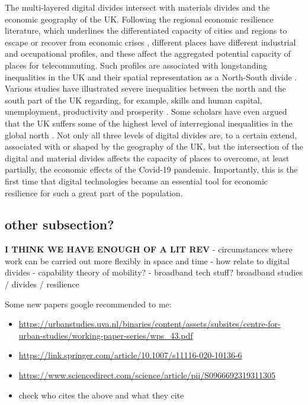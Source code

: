\documentclass[]{interact}
\theoremstyle{plain}%
\theoremstyle{definition}
\theoremstyle{remark}
\def\tightlist{}
\begin{document}
The multi-layered digital divides intersect with materials divides and
the economic geography of the UK. Following the regional economic
resilience literature, which underlines the differentiated capacity of
cities and regions to escape or recover from economic crises
\citep{martin2012regional, kitsos2018economic}, different places have
different industrial and occupational profiles, and these affect the
aggregated potential capacity of places for telecommuting. Such profiles
are associated with longstanding inequalities in the UK and their
spatial representation as a North-South divide
\citep{martin_north_south}. Various studies have illustrated severe
inequalities between the north and the south part of the UK regarding,
for example, skills and human capital, unemployment, productivity and
prosperity \citep{lee2014grim, mccann2020perceptions, dorling2018peak}.
Some scholars have even argued that the UK suffers some of the highest
level of interregional inequalities in the global north
\citep{gal2018reducing, mccann2016uk}. Not only all three levels of
digital divides are, to a certain extend, associated with or shaped by
the geography of the UK, but the intersection of the digital and
material divides affects the capacity of places to overcome, at least
partially, the economic effects of the Covid-19 pandemic. Importantly,
this is the first time that digital technologies became an essential
tool for economic resilience for such a great part of the population.

\hypertarget{other-subsection}{%
\subsection{other subsection?}\label{other-subsection}}

\textbf{I THINK WE HAVE ENOUGH OF A LIT REV} - circumstances where work
can be carried out more flexibly in space and time - how relate to
digital divides - capability theory of mobility? - broadband tech stuff?
broadband studies / divides / resilience

Some new papers google recommended to me:

\begin{itemize}
\tightlist
\item
  \url{https://urbanstudies.uva.nl/binaries/content/assets/subsites/centre-for-urban-studies/working-paper-series/wps_43.pdf}
\item
  \url{https://link.springer.com/article/10.1007/s11116-020-10136-6}
\item
  \url{https://www.sciencedirect.com/science/article/pii/S0966692319311305}
\item
  check who cites the above and what they cite
\end{itemize}
\end{document}
